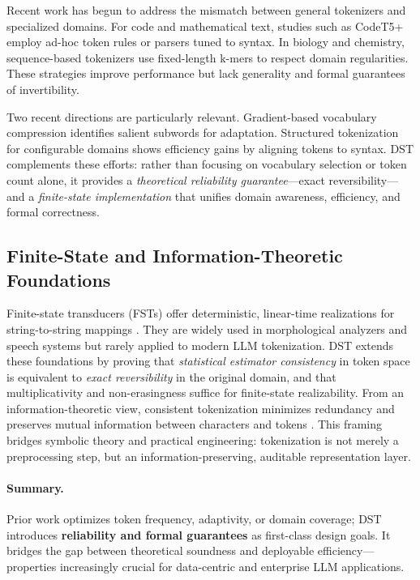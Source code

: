 Recent work has begun to address the mismatch between general tokenizers and specialized domains.
For code and mathematical text, studies such as CodeT5+ \citep{Jiang2023CodeT5Plus} employ ad-hoc token rules or parsers tuned to syntax.
In biology and chemistry, sequence-based tokenizers use fixed-length k-mers to respect domain regularities.
These strategies improve performance but lack generality and formal guarantees of invertibility.

Two recent directions are particularly relevant.
Gradient-based vocabulary compression \citep{Wei2024VocabCompression} identifies salient subwords for adaptation.
Structured tokenization for configurable domains \citep{Xu2024StructuredTokenization} shows efficiency gains by aligning tokens to syntax.
DST complements these efforts: rather than focusing on vocabulary selection or token count alone, it provides a \emph{theoretical reliability guarantee}—exact reversibility—and a \emph{finite-state implementation} that unifies domain awareness, efficiency, and formal correctness.

\subsection{Finite-State and Information-Theoretic Foundations}

Finite-state transducers (FSTs) offer deterministic, linear-time realizations for string-to-string mappings \citep{Mohri2004FST, Roark2011GrammarTokenization}.
They are widely used in morphological analyzers and speech systems but rarely applied to modern LLM tokenization.
DST extends these foundations by proving that \emph{statistical estimator consistency} in token space is equivalent to \emph{exact reversibility} in the original domain, and that multiplicativity and non-erasingness suffice for finite-state realizability.
From an information-theoretic view, consistent tokenization minimizes redundancy and preserves mutual information between characters and tokens \citep{JurafskyMartin2023SpeechNLP, Ding2023ByteLevelTradeoff}.
This framing bridges symbolic theory and practical engineering: tokenization is not merely a preprocessing step, but an information-preserving, auditable representation layer.

\paragraph{Summary.}
Prior work optimizes token frequency, adaptivity, or domain coverage; DST introduces \textbf{reliability and formal guarantees} as first-class design goals.
It bridges the gap between theoretical soundness and deployable efficiency—properties increasingly crucial for data-centric and enterprise LLM applications.


